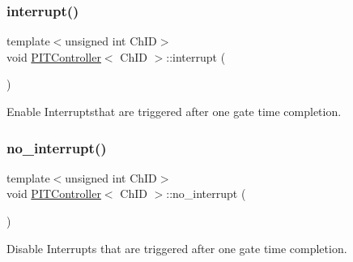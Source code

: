 \subsubsection{\texorpdfstring{interrupt()}{interrupt()}}
{\footnotesize\ttfamily template$<$unsigned int Ch\+ID$>$ \\
void \hyperlink{classPITController}{P\+I\+T\+Controller}$<$ Ch\+ID $>$\+::interrupt (\begin{DoxyParamCaption}{ }\end{DoxyParamCaption})\hspace{0.3cm}{\ttfamily [inline]}}



Enable Interruptsthat are triggered after one gate time completion. 

\mbox{\label{group__Interrupt_ga6e36c84f319e52e5a14ca20f299b64b5}} 
\subsubsection{\texorpdfstring{no\+\_\+interrupt()}{no\_interrupt()}}
{\footnotesize\ttfamily template$<$unsigned int Ch\+ID$>$ \\
void \hyperlink{classPITController}{P\+I\+T\+Controller}$<$ Ch\+ID $>$\+::no\+\_\+interrupt (\begin{DoxyParamCaption}{ }\end{DoxyParamCaption})\hspace{0.3cm}{\ttfamily [inline]}}



Disable Interrupts that are triggered after one gate time completion. 

\mbox{\label{group__Interrupt_gaa94b6dc081d453c8dda54c3ade4b3d94}} 
